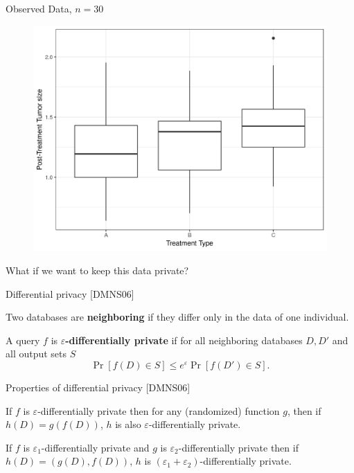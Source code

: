 \documentclass{beamer}
\begin{document}
\begin{frame}{Observed Data, $n=30$}
\begin{figure}
  \includegraphics[scale=0.5]{simulation/observed-plot}
\end{figure}
What if we want to keep this data private?
\end{frame}

\begin{frame}{Differential privacy [DMNS06]}
\pause
\begin{definition}
Two databases are \textbf{neighboring} if they differ only in the data of one individual.
\end{definition}
\pause
\begin{definition}
A query $f$ is \textbf{$\varepsilon$-differentially private} if for all neighboring databases $D, D'$ and all output sets $S$
\begin{equation*}
\Pr[f(D) \in S] \leq e^\varepsilon \Pr[f(D') \in S].
\end{equation*}
\end{definition}
\end{frame}

\begin{frame}{Properties of differential privacy [DMNS06]}
\pause
\begin{theorem}
If $f$ is $\varepsilon$-differentially private then for any (randomized) function $g$, then if $h(D) = g(f(D))$, $h$ is also $\varepsilon$-differentially private.
\end{theorem}
\pause
\begin{theorem}[Composition]
If $f$ is $\varepsilon_1$-differentially private and $g$ is $\varepsilon_2$-differentially private then if $h(D) = (g(D), f(D))$, $h$ is  $(\varepsilon_1+\varepsilon_2)$-differentially private.
\end{theorem}
\end{frame}
\end{document}
